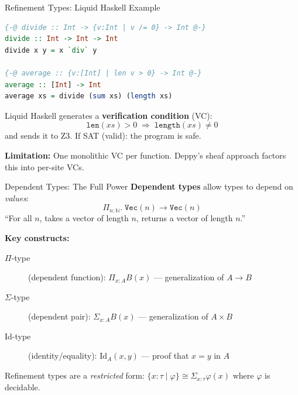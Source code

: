 \documentclass[aspectratio=169,10pt]{beamer}
\begin{document}
\begin{frame}[fragile]{Refinement Types: Liquid Haskell Example}
\begin{lstlisting}[language=Haskell]
{-@ divide :: Int -> {v:Int | v /= 0} -> Int @-}
divide :: Int -> Int -> Int
divide x y = x `div` y

{-@ average :: {v:[Int] | len v > 0} -> Int @-}
average :: [Int] -> Int
average xs = divide (sum xs) (length xs)
\end{lstlisting}

\vspace{0.3em}
Liquid Haskell generates a \textbf{verification condition} (VC):
\[
\texttt{len}(xs) > 0 \;\Rightarrow\; \texttt{length}(xs) \neq 0
\]
and sends it to Z3. If SAT (valid): the program is safe.

\vspace{0.5em}
\textbf{Limitation:} One monolithic VC per function. Deppy's sheaf approach factors this into per-site VCs.
\end{frame}

\begin{frame}{Dependent Types: The Full Power}
\textbf{Dependent types} allow types to depend on \emph{values}:
\[
\Pi_{n:\mathbb{N}}.\; \texttt{Vec}(n) \to \texttt{Vec}(n)
\]
``For all $n$, takes a vector of length $n$, returns a vector of length $n$.''

\vspace{0.3em}
\textbf{Key constructs:}
\begin{description}
  \item[$\Pi$-type] (dependent function): $\Pi_{x:A} B(x)$ --- generalization of $A \to B$
  \item[$\Sigma$-type] (dependent pair): $\Sigma_{x:A} B(x)$ --- generalization of $A \times B$
  \item[Id-type] (identity/equality): $\mathrm{Id}_A(x, y)$ --- proof that $x = y$ in $A$
\end{description}

\vspace{0.3em}
Refinement types are a \emph{restricted} form: $\{x : \tau \mid \varphi\} \cong \Sigma_{x:\tau} \varphi(x)$ where $\varphi$ is decidable.
\end{frame}
\end{document}
